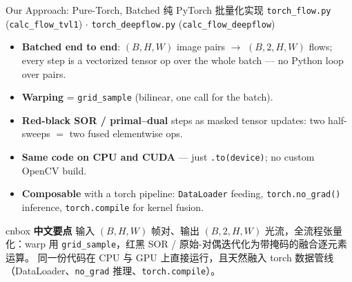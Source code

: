 \documentclass[aspectratio=169,10pt]{beamer}
\newcommand{\zh}[1]{{\zhfont #1}}
\newenvironment{cn}{%
  \begin{beamercolorbox}[rounded=true,sep=4pt,wd=\textwidth]{cnbox}\zhfont\footnotesize
  {\color{cblue!70!black}\textbf{中文要点}}\quad}%
  {\end{beamercolorbox}}
\begin{document}
\begin{frame}{Our Approach: Pure-Torch, Batched \zh{纯 PyTorch 批量化实现}}
  \texttt{torch\_flow.py} (\texttt{calc\_flow\_tvl1}) \quad$\cdot$\quad
  \texttt{torch\_deepflow.py} (\texttt{calc\_flow\_deepflow})
  \begin{itemize}\itemsep2pt
    \item \textbf{Batched end to end}: $(B,H,W)$ image pairs $\to$
      $(B,2,H,W)$ flows; every step is a vectorized tensor op over the whole
      batch --- no Python loop over pairs.
    \item \textbf{Warping} = \texttt{grid\_sample} (bilinear, one call for the
      batch).
    \item \textbf{Red-black SOR / primal--dual} steps as masked tensor
      updates: two half-sweeps $=$ two fused elementwise ops.
    \item \textbf{Same code on CPU and CUDA} --- just
      \texttt{.to(device)}; no custom OpenCV build.
    \item \textbf{Composable} with a torch pipeline: \texttt{DataLoader}
      feeding, \texttt{torch.no\_grad()} inference,
      \texttt{torch.compile} for kernel fusion.
  \end{itemize}
  \vfill
  \begin{cn}
    输入 $(B,H,W)$ 帧对、输出 $(B,2,H,W)$ 光流，全流程张量化：warp 用
    \texttt{grid\_sample}，红黑 SOR / 原始-对偶迭代化为带掩码的融合逐元素运算。
    同一份代码在 CPU 与 GPU 上直接运行，且天然融入 torch 数据管线
    （DataLoader、\texttt{no\_grad} 推理、\texttt{torch.compile}）。
  \end{cn}
\end{frame}
\end{document}
